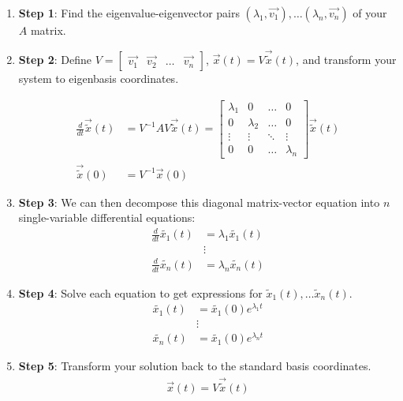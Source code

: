 \begin{enumerate}
    \item \textbf{Step 1}: Find the eigenvalue-eigenvector pairs $(\lambda_1, \vec{v_1}), \dots (\lambda_n, \vec{v_n})$ of your $A$ matrix.

    \item \textbf{Step 2}: Define $V = \begin{bmatrix}
        \vec{v_1} & \vec{v_2} & \dots & \vec{v_n}
    \end{bmatrix}$, $\vec{x}(t) = V \vec{\widetilde{x}}(t)$, and transform your system to eigenbasis coordinates.

    \begin{align*}
    \frac{d}{dt} \vec{\widetilde{x}}(t) &=  V^{-1}AV \vec{\widetilde{x}}(t) =
    \begin{bmatrix}
        \lambda_1 & 0 & \dots & 0 \\
        0 & \lambda_2 & \dots & 0 \\
        \vdots & \vdots & \ddots & \vdots \\
        0 & 0 & \dots & \lambda_n
    \end{bmatrix} \vec{\widetilde{x}}(t) \\
    \vec{\widetilde{x}}(0) &= V^{-1} \vec{x}(0)
    \end{align*}

    \item \textbf{Step 3}: We can then decompose this diagonal matrix-vector equation into $n$ single-variable differential equations:
    \begin{align*}
        \frac{d}{dt} \widetilde{x_1}(t) &= \lambda_1 \widetilde{x_1}(t) \\
        &\vdots \\
        \frac{d}{dt} \widetilde{x_n}(t) &= \lambda_n \widetilde{x_n}(t)
    \end{align*}

    \item \textbf{Step 4}: Solve each equation to get expressions for $\widetilde{x}_1(t), \ldots \widetilde{x}_n(t)$.
    \begin{align*}
        \widetilde{x_1}(t) &= \widetilde{x_1}(0) e^{\lambda_1 t} \\
        &\vdots \\
        \widetilde{x_n}(t) &= \widetilde{x_1}(0) e^{\lambda_n t} 
    \end{align*}

    \item \textbf{Step 5}: Transform your solution back to the standard basis coordinates.
    \begin{align*}
        \vec{x}(t) = V \vec{\widetilde{x}}(t)
    \end{align*}
\end{enumerate}

